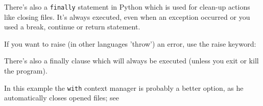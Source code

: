        There's also a \texttt{finally} statement in Python which is used for clean-up
        actions like closing files. It's always executed, even when an exception occurred or you
        used a break, continue or return statement.


        If you want to raise (in other languages 'throw') an error, use the raise keyword:

        There's also a finally clause which will always be executed (unless you exit or kill
        the program).

        In this example the \texttt{with} context manager is probably a better option,
        as he automatically closes opened files; see 
